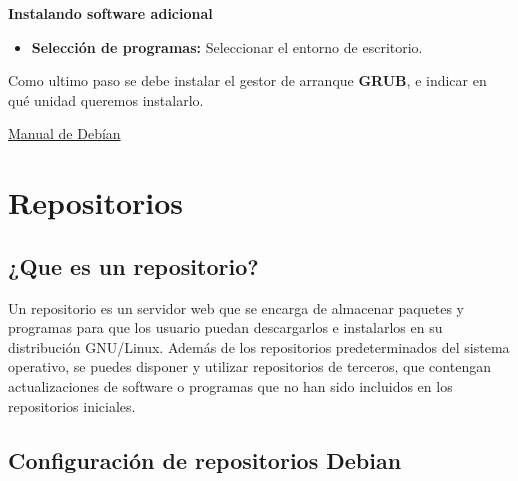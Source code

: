 				\textbf{Instalando software adicional}\par\vspace{0.2cm}
				
				\begin{itemize}
					
					\item \textbf{Selección de programas:} Seleccionar el entorno de escritorio. \par
					
				\end{itemize}
				
				Como ultimo paso se debe instalar el gestor de arranque \textbf{GRUB}, e indicar en qué unidad queremos instalarlo.\par
			
				\begin{tcolorbox}[enhanced,attach boxed title to top center={yshift=-3mm,yshifttext=-1mm},colback=blue!5!white,colframe=blue!75!black,colbacktitle=red!80!black,title= Guía de Instalación,fonttitle=\bfseries, boxed title style={size=small,colframe=red!50!black}]
					
					\centering
					
					\href{https://debian-handbook.info/browse/es-ES/stable/sect.installation-steps.html/}{\color{blue}{}Manual de Debían}
					
				\end{tcolorbox}
	
	\section{Repositorios}
	
		\subsection{¿Que es un repositorio?}
		
			Un repositorio es un servidor web que se encarga de almacenar paquetes y programas para que los usuario puedan descargarlos e instalarlos en su distribución GNU/Linux. Además de los repositorios predeterminados del sistema operativo, se puedes disponer y utilizar repositorios de terceros, que contengan actualizaciones de software o programas que no han sido incluidos en los repositorios iniciales.\par
			
		\subsection{Configuración de repositorios Debian}


